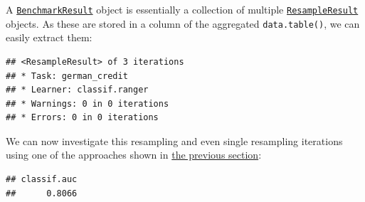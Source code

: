 \documentclass[
]{scrbook}
\newenvironment{Shaded}{\begin{snugshade}}{\end{snugshade}}
\newcommand{\CommentTok}[1]{\textcolor[rgb]{0.56,0.35,0.01}{\textit{#1}}}
\newcommand{\DecValTok}[1]{\textcolor[rgb]{0.00,0.00,0.81}{#1}}
\newcommand{\FunctionTok}[1]{\textcolor[rgb]{0.00,0.00,0.00}{#1}}
\newcommand{\NormalTok}[1]{#1}
\newcommand{\OtherTok}[1]{\textcolor[rgb]{0.56,0.35,0.01}{#1}}
\newcommand{\SpecialCharTok}[1]{\textcolor[rgb]{0.00,0.00,0.00}{#1}}
\newcommand{\StringTok}[1]{\textcolor[rgb]{0.31,0.60,0.02}{#1}}
\renewenvironment{Shaded} {\begin{snugshade}\small} {\end{snugshade}}
\begin{document}
A \href{https://mlr3.mlr-org.com/reference/BenchmarkResult.html}{\texttt{BenchmarkResult}} object is essentially a collection of multiple \href{https://mlr3.mlr-org.com/reference/ResampleResult.html}{\texttt{ResampleResult}} objects.
As these are stored in a column of the aggregated \texttt{data.table()}, we can easily extract them:

\begin{Shaded}
\end{Shaded}

\begin{verbatim}
## <ResampleResult> of 3 iterations
## * Task: german_credit
## * Learner: classif.ranger
## * Warnings: 0 in 0 iterations
## * Errors: 0 in 0 iterations
\end{verbatim}

We can now investigate this resampling and even single resampling iterations using one of the approaches shown in \protect\hyperlink{bm-exec}{the previous section}:

\begin{Shaded}
\end{Shaded}

\begin{verbatim}
## classif.auc 
##      0.8066
\end{verbatim}

\begin{Shaded}
\end{Shaded}
\end{document}
